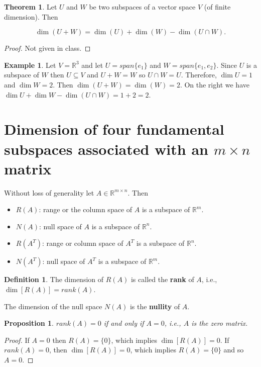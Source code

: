 \documentclass[12pt]{article}
\newtheorem*{proposition}{Proposition}
\theoremstyle{definition}
\newtheorem*{definition}{Definition}
\newtheorem*{example}{Example}
\newtheorem{theorem}{Theorem}[section]  %
\begin{document}
\begin{theorem}
Let $U$ and $W$ be two subspaces of a vector space $V$ (of finite dimension). Then

\[ \dim(U + W) = \dim(U) + \dim(W) - \dim (U \cap W).\]

\end{theorem}

\begin{proof}
Not given in class.
\end{proof}

\begin{example}
Let $V = \mathbb{R}^3$ and let $U = span\{e_1\}$ and $W = span\{ e_1, e_2 \}$. Since
$U$ is a subspace of $W$ then $U \subseteq V$ and $U + W = W$ so $U \cap W = U$.
Therefore, $\dim U = 1$ and $\dim W = 2$. Then $\dim (U + W) = \dim(W) = 2$. On the
right we have $\dim U + \dim W - \dim(U \cap W) = 1 + 2 = 2$.
\end{example}

\section{Dimension of four fundamental subspaces associated with an $m \times n$ matrix}

Without loss of generality let $A \in \mathbb{R}^{m \times n}$. Then

\begin{itemize}
\item $R(A)$: range or the column space of $A$ is a subspace of $\mathbb{R}^m$.
\item $N(A)$: null space of $A$ is a subspace of $\mathbb{R}^n$.
\item $R(A^T)$: range or column space of $A^T$ is a subspace of $\mathbb{R}^n$.
\item $N(A^T)$: null space of $A^T$ is a subspace of $\mathbb{R}^m$.
\end{itemize}

\begin{definition}
The dimension of $R(A)$ is called the \textbf{rank} of $A$, i.e., $\dim[R(A)] = rank(A)$.

The dimension of the null space $N(A)$ is the \textbf{nullity} of $A$.
\end{definition}

\begin{proposition}
$rank(A) = 0$ if and only if $A = 0$, i.e., $A$ is the zero matrix.
\end{proposition}

\begin{proof}
If $A = 0$ then $R(A) = \{ 0 \}$, which implies $\dim[R(A)] = 0$. If $rank(A) = 0$, then
$\dim[R(A)] = 0$, which implies $R(A) = \{ 0 \}$ and so $A = 0$.
\end{proof}
\end{document}
